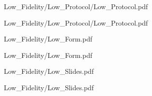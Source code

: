 \documentclass[a4 paper, 12pt]{article}
\begin{document}
    \pagebreak
            
    
                    {Low_Fidelity/Low_Protocol/Low_Protocol.pdf}
                    \label{sec:A.1}
    
                    {Low_Fidelity/Low_Protocol/Low_Protocol.pdf}

    \pagebreak
    
                    {Low_Fidelity/Low_Form.pdf}
                    \label{sec:A.2}
    
                    {Low_Fidelity/Low_Form.pdf}

    \pagebreak
    
                    {Low_Fidelity/Low_Slides.pdf}
                    \label{sec:A.3}
    
                    {Low_Fidelity/Low_Slides.pdf}
\end{document}
